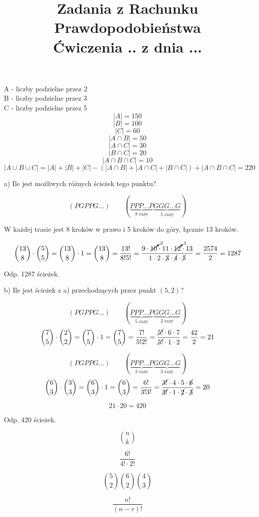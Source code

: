 \documentclass[fleqn]{article}
\begin{document}
\title{Zadania z Rachunku Prawdopodobieństwa \\ Ćwiczenia .. z dnia ...}
\date{}
\medskip
{} 
\medskip


\medskip

\medskip

A - liczby podzielne przez 2 \\
B - liczby podzielne przez 3 \\
C - liczby podzielne przez 5 \\
\[|A| = 150\]
\[|B| = 100\]
\[|C| = 60 \]
\[|A \cap B| = 50\]
\[|A \cap C| = 30\]
\[|B \cap C| = 20\]
\[|A \cap B \cap C| = 10\]
\[|A \cup B \cup C| = |A| + |B| + |C| - (|A \cap B|  + |A \cap C| + |B \cap C|) + |A \cap B \cap C| = 220 \]

\medskip

a) Ile jest możliwych różnych ścieżek tego punktu?

\[(PGPPG...) \qquad 
(\underbrace{PPP...P}_{\displaystyle\text{8 razy}}
\underbrace{GGG...G}_{\displaystyle\text{5 razy}})\]

W każdej trasie jest 8 kroków w prawo i 5 kroków do góry, łącznie 13 kroków.

\[{13 \choose 8} \cdot {5 \choose 5}
={13 \choose 8} \cdot 1={13 \choose 8}
= \frac{13!}{8!5!}
= \frac{9 \cdot \cancelto{2}{10} \cdot 11 \cdot \cancelto{1}{12} \cdot 13}
{1 \cdot 2 \cdot \cancel{3} \cdot \cancel{4} \cdot \cancel{5}}
= \frac{2574}{2}=1287\]

Odp. 1287 ścieżek.

\vspace{1em}

b) Ile jest ścieżek z a) przechodzących przez punkt $(5, 2)$?

\[(PGPPG...) \qquad 
(\underbrace{PPP...P}_{\displaystyle\text{5 razy}}
\underbrace{GGG...G}_{\displaystyle\text{2 razy}})\]
\[{7 \choose 5} \cdot {2 \choose 2}
= {7 \choose 5} \cdot 1
= {7 \choose 5}
= \frac{7!}{5!2!}
= \frac{\cancel{5!} \cdot 6 \cdot 7}{\cancel{5!} \cdot 1 \cdot 2}
= \frac{42}{2}=21\]

\[(PGPPG...) \qquad 
(\underbrace{PPP...P}_{\displaystyle\text{3 razy}}\underbrace{GGG...G}_{\displaystyle\text{3 razy}})\]
\[{6 \choose 3} \cdot {3 \choose 3}
={6 \choose 3} \cdot 1
={6 \choose 3}
=\frac{6!}{3!3!}
=\frac{\cancel{3!} \cdot 4 \cdot 5 \cdot \cancel{6}}
{\cancel{3!} \cdot 1 \cdot \cancel{2} \cdot \cancel{3}}
= 20\]

\[21  \cdot  20 = 420\]

Odp. 420 ścieżek.
\medskip

\medskip
\[{n\choose k}\]
\medskip

\medskip
\[\frac{6!}{4! \cdot 2!}\]
\medskip

\medskip
\[{5\choose 2} {6\choose 2} {4\choose 3}\]

\medskip
\[\frac{n!}{(n - r)!}\]
\medskip
\end{document}
